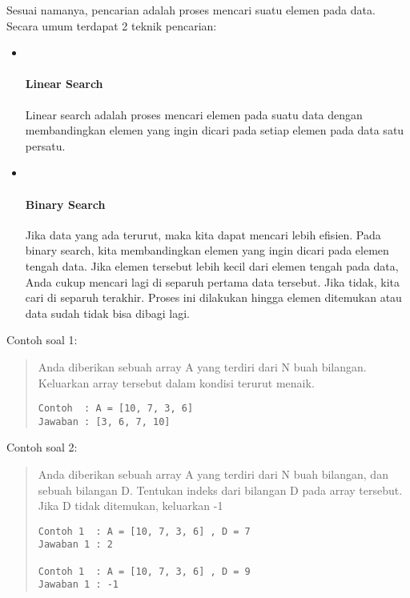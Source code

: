\documentclass[]{article}
\let\oldparagraph\paragraph
\renewcommand{\paragraph}[1]{\oldparagraph{#1}\mbox{}}
\begin{document}
Sesuai namanya, pencarian adalah proses mencari suatu elemen pada data.
Secara umum terdapat 2 teknik pencarian:

\begin{itemize}
\item ~
  \paragraph{Linear Search}\label{linear-search}

  Linear search adalah proses mencari elemen pada suatu data dengan
  membandingkan elemen yang ingin dicari pada setiap elemen pada data
  satu persatu.
\item ~
  \paragraph{Binary Search}\label{binary-search}

  Jika data yang ada terurut, maka kita dapat mencari lebih efisien.
  Pada binary search, kita membandingkan elemen yang ingin dicari pada
  elemen tengah data. Jika elemen tersebut lebih kecil dari elemen
  tengah pada data, Anda cukup mencari lagi di separuh pertama data
  tersebut. Jika tidak, kita cari di separuh terakhir. Proses ini
  dilakukan hingga elemen ditemukan atau data sudah tidak bisa dibagi
  lagi.
\end{itemize}

Contoh soal 1:

\begin{quote}
Anda diberikan sebuah array A yang terdiri dari N buah bilangan.
Keluarkan array tersebut dalam kondisi terurut menaik.

\begin{verbatim}
Contoh  : A = [10, 7, 3, 6]
Jawaban : [3, 6, 7, 10]
\end{verbatim}
\end{quote}

Contoh soal 2:

\begin{quote}
Anda diberikan sebuah array A yang terdiri dari N buah bilangan, dan
sebuah bilangan D. Tentukan indeks dari bilangan D pada array tersebut.
Jika D tidak ditemukan, keluarkan -1

\begin{verbatim}
Contoh 1  : A = [10, 7, 3, 6] , D = 7
Jawaban 1 : 2

Contoh 1  : A = [10, 7, 3, 6] , D = 9
Jawaban 1 : -1
\end{verbatim}
\end{quote}
\end{document}

